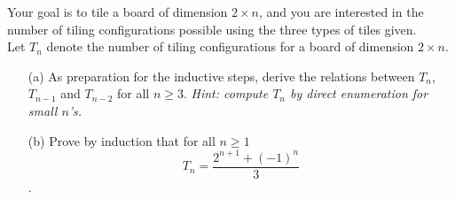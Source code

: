 \documentclass[11pt]{article}
\newif\ifsolutions
\begin{document}
\begin{qunlist}
Your goal is to tile a board of dimension $2 \times n$, and you are interested in the number of
tiling configurations possible using the three types of tiles given. \\
Let $T_n$ denote the number of tiling configurations for a board of dimension $2 \times n$.
\begin{itemize}
\item[(a)] As preparation for the inductive steps, derive the relations between $T_n$, $T_{n-1}$ 
and $T_{n-2}$ for all $n \geq 3$. \textit{Hint: compute $T_n$ by direct enumeration for small $n$'s.}

\ifsolutions
\textbf{Solutions:} $T_n = T_{n-1} + 2T_{n-2}$ for all $n \geq 3$\\
We enumerate the tilings for a $2 \times n$ board by considering three cases depending on
the tile covering the bottom square of the first column. 
\begin{itemize}
\item[(i)] The tile is \textbf{A}: then the first two columns of the board must be tiled with \textbf{AA}.
The remaining $2 \times (n-2)$ board can be tiled in $T_{n-2}$ ways.
\item[(ii)] The tile is \textbf{B}: the first column is tiled with \textbf{A}, and
the remaining $2 \times (n-1)$ board can be tiled in $T_{n-1}$ ways.
\item[(iii)] The tile is \textbf{C}: the first two columns of the board are tiled with \textbf{C}, and
the remaining $2 \times (n-2)$ board can be tiled in $T_{n-2}$ ways.
\end{itemize}
Note that the three cases are exhaustive and mutually exclusive. The number of tilings for a $2 \times n$
board therefore satisfies the recurrence relation as proposed.
\fi


\item[(b)] Prove by induction that for all $n \geq 1$
\[ T_n = \frac{2^{n+1}+(-1)^n}{3} \]. 


\end{itemize}
\end{qunlist}
\end{document}
